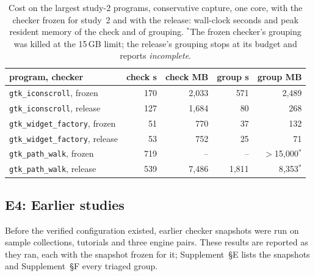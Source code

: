 \documentclass[acmtog,anonymous,review]{acmart}
\newcommand{\code}[1]{\texttt{#1}}
\newcommand{\supp}[1]{Supplement~\S#1}
\begin{document}
\begin{table}[t]
\caption{Cost on the largest study-2 programs, conservative capture, one core, with the checker frozen for study~2
and with the release: wall-clock seconds and peak resident
memory of the check and of grouping. $^\ast$The frozen checker's grouping was killed at the 15\,GB limit; the release's
grouping stops at its budget and reports \emph{incomplete}.}
\label{tab:cost}
\small
\setlength{\tabcolsep}{4pt}
\begin{tabular}{@{}lrrrr@{}}
\toprule
program, checker & check s & check MB & group s & group MB \\
\midrule
\code{gtk\_iconscroll}, frozen & 170 & 2,033 & 571 & 2,489 \\
\code{gtk\_iconscroll}, release & 127 & 1,684 & 80 & 268 \\
\code{gtk\_widget\_factory}, frozen & 51 & 770 & 37 & 132 \\
\code{gtk\_widget\_factory}, release & 53 & 752 & 25 & 71 \\
\code{gtk\_path\_walk}, frozen & 719 & -- & -- & $>$15,000$^\ast$ \\
\code{gtk\_path\_walk}, release & 539 & 7,486 & 1,811 & 8,353$^\ast$ \\
\bottomrule
\end{tabular}
\end{table}

\subsection{E4: Earlier studies}
\label{sec:eval-real}

Before the verified configuration existed, earlier checker snapshots were run on sample collections, tutorials and
three engine pairs. These results are reported as they ran, each with the snapshot frozen for it; \supp{E} lists the
snapshots and \supp{F} every triaged group.
\end{document}
